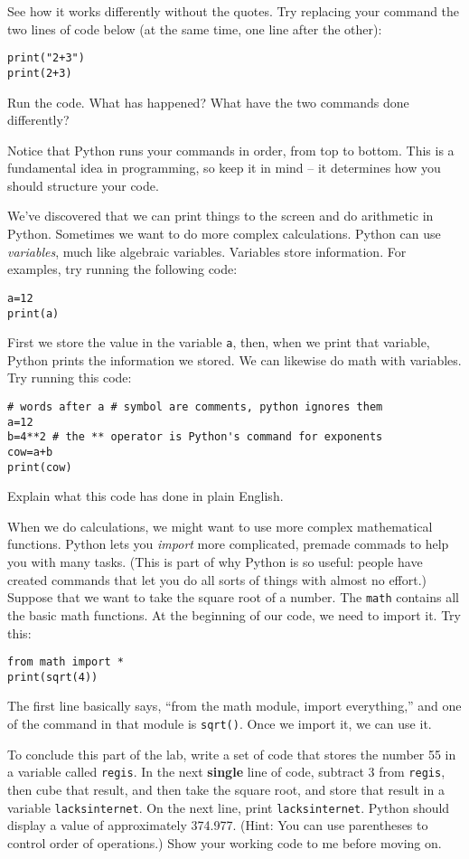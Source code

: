 \documentclass[10pt]{article}
\begin{document}
See how it works differently without the quotes. Try replacing your command the two lines of code  below (at the same time, one line after the other):
\begin{verbatim}
print("2+3")
print(2+3)
\end{verbatim}
Run the code. What has happened? What have the two commands done differently?

Notice that Python runs your commands in order, from top to bottom. This is a fundamental idea in programming, so keep it in mind -- it determines how you should structure your code.

We've discovered that we can print things to the screen and do arithmetic in Python. Sometimes we want to do more complex calculations. Python can use \textit{variables}, much like algebraic variables. Variables store information. For examples, try running the following code:
\begin{verbatim}
a=12
print(a)
\end{verbatim}
First we store the value in the variable \texttt{a}, then, when we print that variable, Python prints the information we stored. We can likewise do math with variables. Try running this code:
\begin{verbatim}
# words after a # symbol are comments, python ignores them 
a=12
b=4**2 # the ** operator is Python's command for exponents
cow=a+b
print(cow)
\end{verbatim}
Explain what this code has done in plain English.

When we do calculations, we might want to use more complex mathematical functions. Python lets you \textit{import} more complicated, premade commads to help you with many tasks. (This is part of why Python is so useful: people have created commands that let you do all sorts of things with almost no effort.) Suppose that we want to take the square root of a number. The \texttt{math} contains all the basic math functions. At the beginning of our code, we need to import it. Try this:
\begin{verbatim}
from math import *
print(sqrt(4))
\end{verbatim}
The first line basically says, ``from the math module, import everything,'' and one of the command in that module is \texttt{sqrt()}. Once we import it, we can use it.

To conclude this part of the lab, write a set of code that stores the number 55 in a variable called \texttt{regis}. In the next \textbf{single} line of code,  subtract 3  from \texttt{regis}, then cube that result, and then take the square root, and store that result in a variable \texttt{lacksinternet}. On the next line, print \texttt{lacksinternet}. Python should display a value of approximately 374.977. (Hint: You can use parentheses to control order of operations.) Show your working code to me before moving on.
\end{document}

